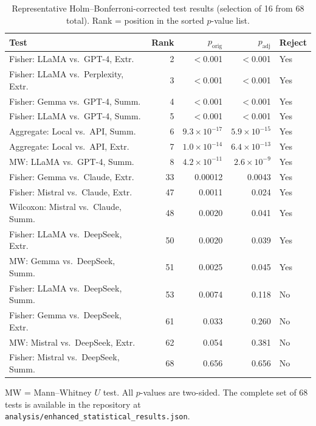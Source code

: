 \documentclass[11pt]{article}
\begin{document}
\begin{table}[H]
\centering
\caption{Representative Holm--Bonferroni-corrected test results (selection of 16 from 68 total). Rank = position in the sorted $p$-value list.}
\label{tab:holm}
\small
\begin{tabular}{@{}lrrrl@{}}
\toprule
\textbf{Test} & \textbf{Rank} & \textbf{$p_{\text{orig}}$} & \textbf{$p_{\text{adj}}$} & \textbf{Reject} \\
\midrule
Fisher: LLaMA vs.\ GPT-4, Extr. & 2 & $<$0.001 & $<$0.001 & Yes \\
Fisher: LLaMA vs.\ Perplexity, Extr. & 3 & $<$0.001 & $<$0.001 & Yes \\
Fisher: Gemma vs.\ GPT-4, Summ. & 4 & $<$0.001 & $<$0.001 & Yes \\
Fisher: LLaMA vs.\ GPT-4, Summ. & 5 & $<$0.001 & $<$0.001 & Yes \\
Aggregate: Local vs.\ API, Summ. & 6 & $9.3 \times 10^{-17}$ & $5.9 \times 10^{-15}$ & Yes \\
Aggregate: Local vs.\ API, Extr. & 7 & $1.0 \times 10^{-14}$ & $6.4 \times 10^{-13}$ & Yes \\
MW: LLaMA vs.\ GPT-4, Summ. & 8 & $4.2 \times 10^{-11}$ & $2.6 \times 10^{-9}$ & Yes \\
Fisher: Gemma vs.\ Claude, Extr. & 33 & 0.00012 & 0.0043 & Yes \\
Fisher: Mistral vs.\ Claude, Extr. & 47 & 0.0011 & 0.024 & Yes \\
Wilcoxon: Mistral vs.\ Claude, Summ. & 48 & 0.0020 & 0.041 & Yes \\
Fisher: LLaMA vs.\ DeepSeek, Extr. & 50 & 0.0020 & 0.039 & Yes \\
MW: Gemma vs.\ DeepSeek, Summ. & 51 & 0.0025 & 0.045 & Yes \\
Fisher: LLaMA vs.\ DeepSeek, Summ. & 53 & 0.0074 & 0.118 & No \\
Fisher: Gemma vs.\ DeepSeek, Extr. & 61 & 0.033 & 0.260 & No \\
MW: Mistral vs.\ DeepSeek, Extr. & 62 & 0.054 & 0.381 & No \\
Fisher: Mistral vs.\ DeepSeek, Summ. & 68 & 0.656 & 0.656 & No \\
\bottomrule
\end{tabular}
\par\smallskip\raggedright\footnotesize
MW = Mann--Whitney $U$ test. All $p$-values are two-sided. The complete set of 68 tests is available in the repository at \texttt{analysis/enhanced\_statistical\_results.json}.
\end{table}
\end{document}
